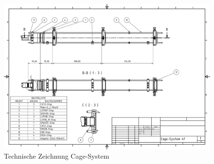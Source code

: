\documentclass[titlepage]{article}
\begin{document}
\begin{figure}
	\includegraphics[width=\textwidth]{figures/4f_system.pdf}
	\caption{Technische Zeichnung Cage-System}
	\label{fig:tz_cage_system}
\end{figure}
\newpage
\end{document}
